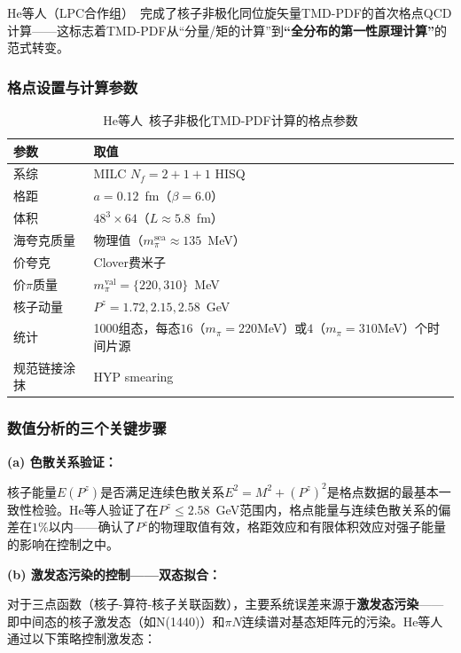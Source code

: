 \documentclass[12pt,a4paper]{ctexart}
\theoremstyle{definition}
\begin{document}
He等人（LPC合作组）~\cite{He2024unpolTMD}完成了核子非极化同位旋矢量TMD-PDF的首次格点QCD计算——这标志着TMD-PDF从``分量/矩的计算''到\textbf{``全分布的第一性原理计算''}的范式转变。

\subsubsection{格点设置与计算参数}

\begin{table}[H]
\centering
\caption{He等人~\cite{He2024unpolTMD}核子非极化TMD-PDF计算的格点参数}
\label{tab:He2024_parameters}
\begin{tabular}{ll}
\toprule
参数 & 取值 \\
\midrule
系综 & MILC $N_f = 2+1+1$ HISQ \\
格距 & $a = 0.12$~fm（$\beta = 6.0$） \\
体积 & $48^3 \times 64$（$L \approx 5.8$~fm） \\
海夸克质量 & 物理值（$m_\pi^{\text{sea}} \approx 135$~MeV） \\
价夸克 & Clover费米子 \\
价$\pi$质量 & $m_\pi^{\text{val}} = \{220, 310\}$~MeV \\
核子动量 & $P^z = 1.72, 2.15, 2.58$~GeV \\
统计 & 1000组态，每态$16$（$m_\pi=220$MeV）或$4$（$m_\pi=310$MeV）个时间片源 \\
规范链接涂抹 & HYP smearing \\
\bottomrule
\end{tabular}
\end{table}

\subsubsection{数值分析的三个关键步骤}

\textbf{(a) 色散关系验证：}

核子能量$E(P^z)$是否满足连续色散关系$E^2 = M^2 + (P^z)^2$是格点数据的最基本一致性检验。He等人验证了在$P^z \le 2.58$~GeV范围内，格点能量与连续色散关系的偏差在$1\%$以内——确认了$P^z$的物理取值有效，格距效应和有限体积效应对强子能量的影响在控制之中。

\textbf{(b) 激发态污染的控制——双态拟合：}

对于三点函数（核子-算符-核子关联函数），主要系统误差来源于\textbf{激发态污染}——即中间态的核子激发态（如N(1440)）和$\pi N$连续谱对基态矩阵元的污染。He等人通过以下策略控制激发态：
\end{document}
